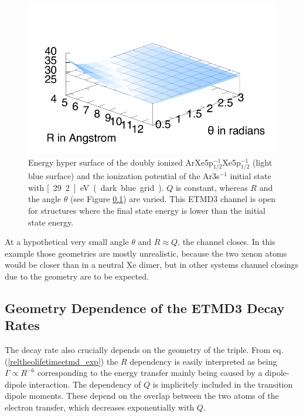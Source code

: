 \begin{figure}[htb]
 \centering
 \includegraphics[scale=0.8]{pics/ArXeXe12_12_surf.pdf}
 \caption{Energy hyper surface of the doubly ionized
          ArXe5p$_{1/2}^{-1}$Xe5p$_{1/2}^{-1}$ (light blue surface) and the ionization
          potential of the Ar3s$^{-1}$ initial state with \unit[29.2]{eV}
          (dark blue grid). $Q$ is constant, whereas $R$ and the angle $\theta$
          (see Figure \ref{}) are varied. This ETMD3 channel is open for
          structures where
          the final state energy is lower than the initial state energy.}
 \label{figure:ArXe2_geom_energy}
\end{figure}

At a hypothetical very small angle $\theta$ and $R\approx Q$, the channel closes.
In this example those geometries are mostly unrealistic, because the two xenon
atoms would be closer than in a neutral Xe dimer, but in other systems
channel closings due to the geometry are to be expected.


\subsection{Geometry Dependence of the ETMD3 Decay Rates}
The decay rate also crucially depends on the geometry of the triple.
From eq. (\ref{reltheolifetimeetmd_exp}) the $R$ dependency is
easily interpreted as being
$\Gamma \propto R^{-6}$ corresponding to the energy transfer mainly being
caused by a dipole-dipole interaction. The dependency of $Q$ is implicitely
included in the transition dipole moments. These depend on the overlap
between the two atoms of the electron transfer, which decreases exponentially
with $Q$.



